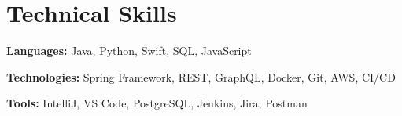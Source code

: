 \section*{Technical Skills}
\noindent\makebox[\linewidth]{\rule{\textwidth}{0.2pt}}

\textbf{Languages:} Java, Python, Swift, SQL, JavaScript
\vspace{2pt}

\textbf{Technologies:} Spring Framework, REST, GraphQL, Docker, Git, AWS, CI/CD
\vspace{2pt}

\textbf{Tools:} IntelliJ, VS Code, PostgreSQL, Jenkins, Jira, Postman